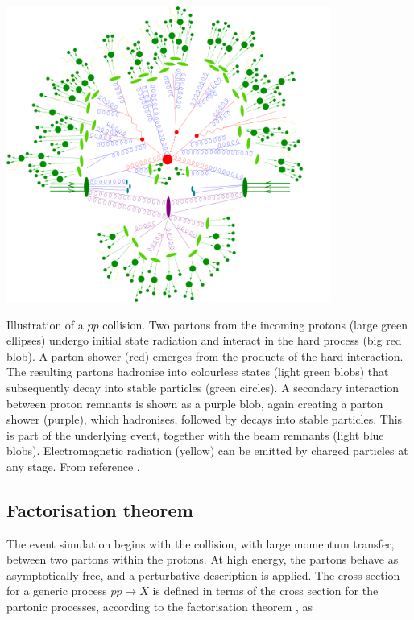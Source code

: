 \bfig[h!]
\centering
\includegraphics[width=0.8\textwidth]{figures/EvtGen/event}
\captionsetup{width=0.85\textwidth} \caption{\small Illustration of a $pp$ collision. Two partons from the incoming protons (large green ellipses) undergo initial state radiation and interact in the hard process (big red blob). A parton shower (red) emerges from the products of the hard interaction. The resulting partons hadronise into colourless states (light green blobs) that subsequently decay into stable particles (green circles). A secondary interaction between proton remnants is shown as a purple blob, again creating a parton shower (purple), which hadronises, followed by decays into stable particles. This is part of the underlying event, together with the beam remnants (light blue blobs). Electromagnetic radiation (yellow) can be emitted by charged particles at any stage. From reference \cite{Siegert:2010cru}.}
\label{sec:evtgen:fig:evt}
\efig

\subsection{Factorisation theorem}
\label{chp:evtsim:evtgen:hp}

The event simulation begins with the collision, with large momentum transfer, between two partons within the protons. At high energy, the partons behave as asymptotically free, and a perturbative description is applied. The cross section for a generic process $pp \to X$ is defined in terms of the cross section for the partonic processes, according to the factorisation theorem \cite{Collins:1989gx}, as

